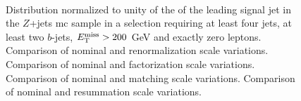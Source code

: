 \begin{figure}[h!]
\centering 
{}
\\
\caption{Distribution normalized to unity of the \pt of the leading signal jet in the $Z$+jets \gls{mc} sample in a selection requiring at least four jets, at least two $b$-jets, $E_{\rm T}^{\mathrm{miss}}>200$ GeV and exactly zero leptons. 
 Comparison of nominal and renormalization scale variations.
 Comparison of nominal and factorization scale variations.
 Comparison of nominal and matching scale variations.
 Comparison of nominal and resummation scale variations.
}\label{fig:Z_met_0L_syst}
\end{figure}

